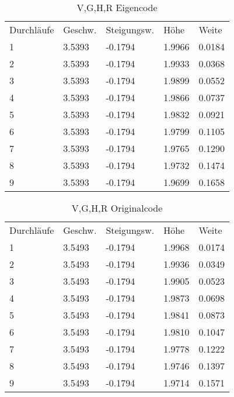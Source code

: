 \documentclass{article}
\begin{document}
\begin{table}
\centering
\caption{V,G,H,R Eigencode}
\begin{tabular}{lllll}
Durchläufe & Geschw. & Steigungsw. & Höhe   & Weite   \\
1          & 3.5393  & -0.1794     & 1.9966 & 0.0184  \\
2          & 3.5393  & -0.1794     & 1.9933 & 0.0368  \\
3          & 3.5393  & -0.1794     & 1.9899 & 0.0552  \\
4          & 3.5393  & -0.1794     & 1.9866 & 0.0737  \\
5          & 3.5393  & -0.1794     & 1.9832 & 0.0921  \\
6          & 3.5393  & -0.1794     & 1.9799 & 0.1105  \\
7          & 3.5393  & -0.1794     & 1.9765 & 0.1290  \\
8          & 3.5393  & -0.1794     & 1.9732 & 0.1474  \\
9          & 3.5393  & -0.1794     & 1.9699 & 0.1658 
\end{tabular}
\end{table}
\begin{table}
\centering
\caption{V,G,H,R Originalcode}
\begin{tabular}{lllll}
Durchläufe & Geschw. & Steigungsw. & Höhe   & Weite   \\
1          & 3.5493  & -0.1794     & 1.9968 & 0.0174  \\
2          & 3.5493  & -0.1794     & 1.9936 & 0.0349  \\
3          & 3.5493  & -0.1794     & 1.9905 & 0.0523  \\
4          & 3.5493  & -0.1794     & 1.9873 & 0.0698  \\
5          & 3.5493  & -0.1794     & 1.9841 & 0.0873  \\
6          & 3.5493  & -0.1794     & 1.9810 & 0.1047  \\
7          & 3.5493  & -0.1794     & 1.9778 & 0.1222  \\
8          & 3.5493  & -0.1794     & 1.9746 & 0.1397  \\
9          & 3.5493  & -0.1794     & 1.9714 & 0.1571 
\end{tabular}
\end{table}
\end{document}
